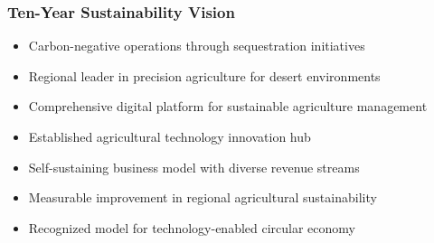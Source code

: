 \subsubsection{Ten-Year Sustainability Vision}
\begin{itemize}
    \item Carbon-negative operations through sequestration initiatives
    \item Regional leader in precision agriculture for desert environments
    \item Comprehensive digital platform for sustainable agriculture management
    \item Established agricultural technology innovation hub
    \item Self-sustaining business model with diverse revenue streams
    \item Measurable improvement in regional agricultural sustainability
    \item Recognized model for technology-enabled circular economy
\end{itemize} 